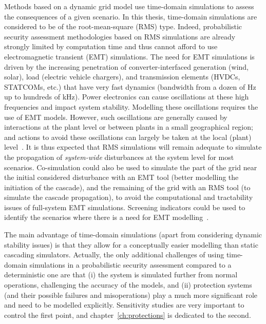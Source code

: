 Methods based on a dynamic grid model use time-domain simulations to assess the consequences of a given scenario. In this thesis, time-domain simulations are considered to be of the root-mean-square (RMS) type. Indeed, probabilistic security assessment methodologies based on RMS simulations are already strongly limited by computation time and thus cannot afford to use electromagnetic transient (EMT) simulations. The need for EMT simulations is driven by the increasing penetration of converter-interfaced generation (wind, solar), load (electric vehicle chargers), and transmission elements (HVDCs, STATCOMs, etc.) that have very fast dynamics (bandwidth from a dozen of Hz up to hundreds of kHz). Power electronics can cause oscillations at these high frequencies and impact system stability. Modelling these oscillations requires the use of EMT models. However, such oscillations are generally caused by interactions at the plant level or between plants in a small geographical region; and actions to avoid these oscillations can largely be taken at the local (plant) level~\cite{AvoidEMT}. %
It is thus expected that RMS simulations will remain adequate to simulate the propagation of \emph{system-wide} disturbances at the system level for most scenarios. Co-simulation could also be used to simulate the part of the grid near the initial considered disturbance with an EMT tool (better modelling the initiation of the cascade), and the remaining of the grid with an RMS tool (to simulate the cascade propagation), to avoid the computational and tractability issues of full-system EMT simulations. Screening indicators could be used to identify the scenarios where there is a need for EMT modelling~\cite{CIGRE_book_screening}.

The main advantage of time-domain simulations (apart from considering dynamic stability issues) is that they allow for a conceptually easier modelling than static cascading simulators. Actually, the only additional challenges of using time-domain simulations in a probabilistic security assessment compared to a deterministic one are that (i) the system is simulated further from normal operations, challenging the accuracy of the models, and (ii) protection systems (and their possible failures and misoperations) play a much more significant role and need to be modelled explicitly. Sensitivity studies are very important to control the first point, and chapter~\ref{ch:protections} is dedicated to the second.

